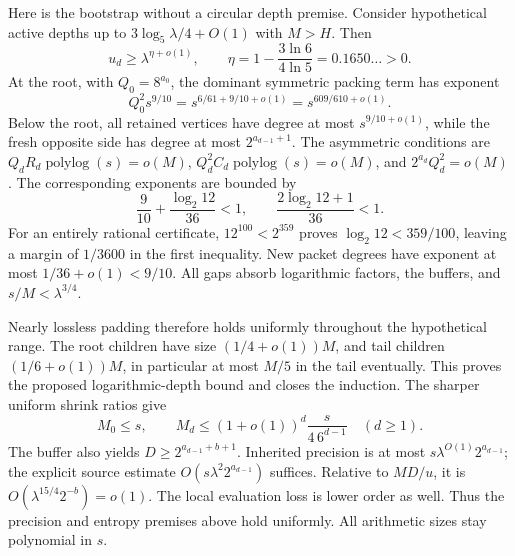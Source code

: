 Here is the bootstrap without a circular depth premise. Consider hypothetical active depths up to $3\log_5\lambda/4+O(1)$ with $M>H$. Then
\[
 u_d\ge\lambda^{\eta+o(1)},\qquad
 \eta=1-\frac{3\ln6}{4\ln5}=0.1650\ldots>0.
\]
At the root, with $Q_0=8^{a_0}$, the dominant symmetric packing term has exponent
\[
 Q_0^2s^{9/10}=s^{6/61+9/10+o(1)}=s^{609/610+o(1)}.
\]
Below the root, all retained vertices have degree at most $s^{9/10+o(1)}$, while the fresh opposite side has degree at most $2^{a_{d-1}+1}$. The asymmetric conditions are
$Q_dR_d\operatorname{polylog}(s)=o(M)$,
$Q_d^2C_d\operatorname{polylog}(s)=o(M)$, and
$2^{a_d}Q_d^2=o(M)$.
The corresponding exponents are bounded by
\[
 \frac9{10}+\frac{\log_2 12}{36}<1,
 \qquad \frac{2\log_2 12+1}{36}<1.
\]
For an entirely rational certificate, $12^{100}<2^{359}$ proves
$\log_2 12<359/100$, leaving a margin of $1/3600$ in the first inequality. New packet degrees have exponent at most $1/36+o(1)<9/10$. All gaps absorb logarithmic factors, the buffers, and $s/M<\lambda^{3/4}$.

Nearly lossless padding therefore holds uniformly throughout the hypothetical range. The root children have size $(1/4+o(1))M$, and tail children $(1/6+o(1))M$, in particular at most $M/5$ in the tail eventually. This proves the proposed logarithmic-depth bound and closes the induction. The sharper uniform shrink ratios give
\[
 M_0\le s,\qquad
 M_d\le(1+o(1))^d\frac{s}{4\,6^{d-1}}\quad(d\ge1).
\]
The buffer also yields $D\ge2^{a_{d-1}+b+1}$. Inherited precision is at most $s\lambda^{O(1)}2^{a_{d-1}}$; the explicit source estimate $O(s\lambda^2 2^{a_{d-1}})$ suffices. Relative to $MD/u$, it is $O(\lambda^{15/4}2^{-b})=o(1)$. The local evaluation loss is lower order as well. Thus the precision and entropy premises above hold uniformly. All arithmetic sizes stay polynomial in $s$.

